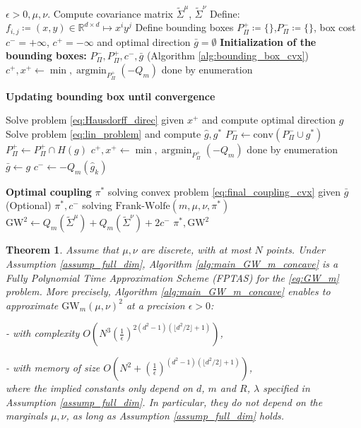 \documentclass{article}
\newcommand{\R}{\mathbb{R}}
\newcommand{\1}{\mathbf{1}}
\newcommand{\GW}{\mathrm{GW}}
\DeclareMathOperator*{\argmin}{argmin}
\newtheorem{theorem}{Theorem}
\theoremstyle{definition}
\theoremstyle{remark}
\begin{document}
\begin{algorithm}
\caption{Main algorithm for $\GW_m$ in dimension $d$, concave cost}\label{alg:main_GW_m_concave}
\begin{algorithmic}[1]
\Require $\epsilon>0, \mu,\nu$.
\State Compute covariance matrix $\tilde{\Sigma}^{\mu}$, $\tilde{\Sigma}^{\nu}$
\State Define:$f_{i,j}\coloneqq (x,y)\in \R^{d\times d}\mapsto x^iy^j$
\State Define bounding boxes $P_\Pi^+\coloneqq\{\}$,$P_\Pi^-\coloneqq\{\}$, box cost $c^- = +\infty$, $c^+ = -\infty$ and optimal direction $\bar{g}=\emptyset$
 \State  \textbf{Initialization of the bounding boxes: }  $P_\Pi^-,P_\Pi^+,c^-, \bar{g}$ (Algorithm \ref{alg:bounding_box_cvx})
\State $c^+,x^+\gets \min,\argmin_{P_\Pi^+} (-Q_m) $ done by enumeration

 \State  \textbf{Updating bounding box until convergence }

    \State Solve problem \eqref{eq:Hausdorff_direc} given $x^+$ and compute optimal direction $g$ \label{alg_cv_dir}
    \State Solve problem \eqref{eq:lin_problem} and compute $\hat{g},g^*$ \label{alg_cv_lin_problem}
    \State $P_\Pi^-\gets \mathrm{conv} (P_\Pi^-\cup g^*)$  
    \State $P_\Pi^+\gets P_\Pi^+\cap H(g)$ 
    \State $c^+,x^+\gets \min,\argmin_{P_\Pi^+} (-Q_m) $ done by enumeration
    \State $\bar{g}\gets g$
    \State $c^-\gets -Q_m(\hat{g}_{ k})$
    \EndIf
\EndWhile


\State  \textbf{Optimal coupling} $\pi^*$ solving convex problem \eqref{eq:final_coupling_cvx} given $\bar{g}$
\State (Optional) $\pi^*, c^-$ solving $\text{Frank-Wolfe}(m,\mu,\nu,\pi^*)$
\State $\GW^2\gets Q_m(\tilde{\Sigma}^{\mu})+Q_m(\tilde{\Sigma}^{\nu})+2c^-$
\State\Return $\pi^*,\GW^2$
\end{algorithmic}
\end{algorithm}

\clearpage
\begin{theorem}\label{theo:FPTAS}
     Assume that $\mu,\nu$ are discrete, with at most $N$ points. Under Assumption \ref{assump_full_dim}, Algorithm \ref{alg:main_GW_m_concave} is a Fully Polynomial Time Approximation Scheme (FPTAS) for the \ref{eq:GW_m} problem. More precisely, Algorithm \ref{alg:main_GW_m_concave} enables to approximate $\GW_m(\mu,\nu)^2$ at a precision $\epsilon>0$:
    
    
    - with complexity $O\left(N^3\left(\frac{1}{\epsilon}\right)^{2(d^2-1)(\lfloor d^2/2\rfloor+1)}\right)$,

    - with  memory of size $O\left(N^2+\left(\frac{1}{\epsilon}\right)^{(d^2-1)(\lfloor d^2/2\rfloor+1)}\right)$,\\
    where the implied constants only depend on $d$,  $m$ and $R$, $\lambda$ specified in Assumption \ref{assump_full_dim}. In particular, they do not depend on the marginals $\mu,\nu$, as long as Assumption \ref{assump_full_dim} holds.
\end{theorem}  
\end{document}
